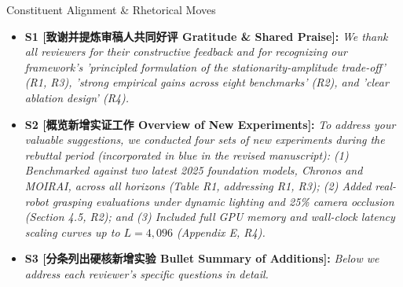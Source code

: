\begin{TipBox}{Constituent Alignment \& Rhetorical Moves}
\begin{itemize}[leftmargin=1.5em]
  \item \textbf{S1 [致谢并提炼审稿人共同好评 Gratitude \& Shared Praise]:} \textit{We thank all reviewers for their constructive feedback and for recognizing our framework's 'principled formulation of the stationarity-amplitude trade-off' (R1, R3), 'strong empirical gains across eight benchmarks' (R2), and 'clear ablation design' (R4).}\par{}
  \item \textbf{S2 [概览新增实证工作 Overview of New Experiments]:} \textit{To address your valuable suggestions, we conducted four sets of new experiments during the rebuttal period (incorporated in blue in the revised manuscript): (1) Benchmarked against two latest 2025 foundation models, Chronos and MOIRAI, across all horizons (Table R1, addressing R1, R3); (2) Added real-robot grasping evaluations under dynamic lighting and 25\% camera occlusion (Section 4.5, R2); and (3) Included full GPU memory and wall-clock latency scaling curves up to $L=4,096$ (Appendix E, R4).}\par{}
  \item \textbf{S3 [分条列出硬核新增实验 Bullet Summary of Additions]:} \textit{Below we address each reviewer's specific questions in detail.}\par{}
\end{itemize}
\end{TipBox}
\bigskip
